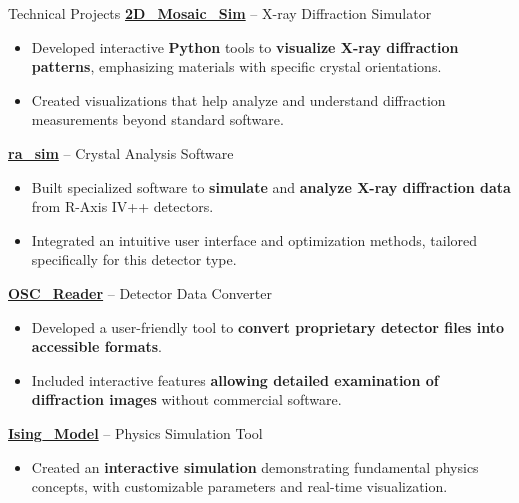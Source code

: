 \begin{rubric}{Technical Projects}
\entry*[2025--Present]%
  \textbf{\href{https://github.com/DVBeckwitt/2D_Mosaic_Sim}{2D\_Mosaic\_Sim}} – X-ray Diffraction Simulator%
  \begin{itemize}
    \item Developed interactive \textbf{Python} tools to \textbf{visualize X-ray diffraction patterns}, emphasizing materials with specific crystal orientations.
    \item Created visualizations that help analyze and understand diffraction measurements beyond standard software.
  \end{itemize}

  \entry*[2024--Present]%
  \textbf{\href{https://github.com/DVBeckwitt/ra_sim}{ra\_sim}} – Crystal Analysis Software%
  \begin{itemize}
    \item Built specialized software to \textbf{simulate} and \textbf{analyze X-ray diffraction data} from R-Axis IV++ detectors.
    \item Integrated an intuitive user interface and optimization methods, tailored specifically for this detector type.
  \end{itemize}

  \entry*[2024]%
  \textbf{\href{https://github.com/DVBeckwitt/OSC_Reader}{OSC\_Reader}} – Detector Data Converter%
  \begin{itemize}
    \item Developed a user-friendly tool to \textbf{convert proprietary detector files into accessible formats}.
    \item Included interactive features \textbf{allowing detailed examination of diffraction images} without commercial software.
  \end{itemize}

  \entry*[2025]%
  \textbf{\href{https://github.com/DVBeckwitt/Ising_Model}{Ising\_Model}} – Physics Simulation Tool%
  \begin{itemize}
    \item Created an \textbf{interactive simulation} demonstrating fundamental physics concepts, with customizable parameters and real-time visualization.
  \end{itemize}
\end{rubric}